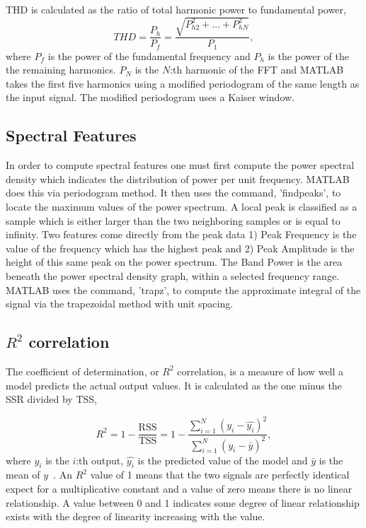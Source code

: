 \documentclass[]{article}
\begin{document}
\gls{THD} is calculated as the ratio of total harmonic power to fundamental power,
\begin{equation}
	THD = \frac{P_{h}}{P_{f}} = \frac{\sqrt{P^2_{h2} + \hdots + P^2_{hN}}}{P_1},
\end{equation}
where $P_{f}$ is the power of the fundamental frequency and $P_{h}$ is the power of the the remaining harmonics. $P_N$ is the $N$:th harmonic of the \gls{FFT} and MATLAB takes the first five harmonics using a modified periodogram of the same length as the input signal. The modified periodogram uses a Kaiser window.

\subsection{Spectral Features}
In order to compute spectral features one must first compute the power spectral density which indicates the distribution of power per unit frequency. MATLAB does this via periodogram method. It then uses the command, 'findpeaks', to locate the maximum values of the power spectrum. A local peak is classified as a sample which is either larger than the two neighboring samples or is equal to infinity. Two features come directly from the peak data 1)
Peak Frequency is the value of the frequency which has the highest peak and 2)
Peak Amplitude is the height of this same peak on the power spectrum.
The Band Power is the area beneath the power spectral density graph, within a selected frequency range. MATLAB uses the command, 'trapz', to compute the approximate integral of the signal via the trapezoidal method with unit spacing.

\subsection{$R^{2}$ correlation}
The coefficient of determination, or $R^{2}$ correlation, is a measure of how well a model predicts the actual output values. It is calculated as the one minus the \gls{SSR} divided by \gls{TSS},

\begin{equation}
R^{2} = 1 - \frac{\textrm{RSS}}{\textrm{TSS}} = 1-\frac{\sum^N_{i=1}(y_i - \hat{y_i})^2}{\sum^N_{i=1}(y_i - \bar{y})^2},
\end{equation}
where $y_i$ is the $i$:th output, $\hat{y_i}$ is the predicted value of the model and $\bar{y}$ is the mean of $y$~\cite{james2013introduction}. An $R^{2}$ value of 1 means that the two signals are perfectly identical expect for a multiplicative constant and a value of zero means there is no linear relationship. A value between 0 and 1 indicates some degree of linear relationship exists with the degree of linearity increasing with the value.
        
\end{document}
